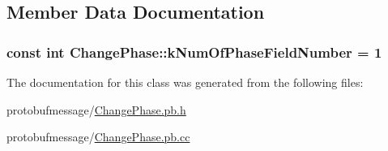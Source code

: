 \subsection{Member Data Documentation}
\hypertarget{class_change_phase_a19b42121df5751cc03a51d1244186f6b}{
\subsubsection[{k\-Num\-Of\-Phase\-Field\-Number}]{\setlength{\rightskip}{0pt plus 5cm}const int Change\-Phase\-::k\-Num\-Of\-Phase\-Field\-Number = 1\hspace{0.3cm}{\ttfamily [static]}}}\label{class_change_phase_a19b42121df5751cc03a51d1244186f6b}


The documentation for this class was generated from the following files\-:\begin{DoxyCompactItemize}
\item 
protobufmessage/\hyperlink{_change_phase_8pb_8h}{Change\-Phase.\-pb.\-h}\item 
protobufmessage/\hyperlink{_change_phase_8pb_8cc}{Change\-Phase.\-pb.\-cc}\end{DoxyCompactItemize}
